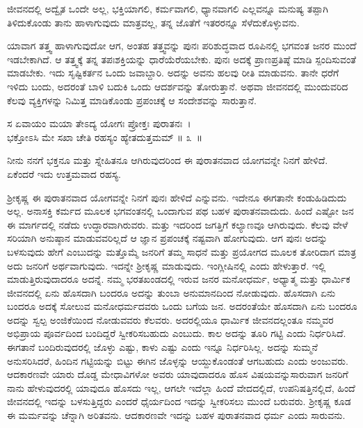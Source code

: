 ಜೀವನದಲ್ಲಿ ಅದ್ವೈತ ಒಂದೇ ಅಲ್ಲ, ಭಕ್ತಿಯಾಗಲಿ, ಕರ್ಮವಾಗಲಿ, ಧ್ಯಾನವಾಗಲಿ ಎಲ್ಲವನ್ನೂ ಮನುಷ್ಯ ತಪ್ಪಾಗಿ ತಿಳಿದುಕೊಂಡು ತಾನು ಹಾಳಾಗುವುದು ಮಾತ್ರವಲ್ಲ, ತನ್ನ ಜೊತೆಗೆ ಇತರರನ್ನೂ ಸೆಳೆದುಕೊಳ್ಳುವನು.

ಯಾವಾಗ ತತ್ತ್ವ ಹಾಳಾಗುವುದೋ ಆಗ, ಅಂತಹ ತತ್ತ್ವವನ್ನು ಪುನಃ ಪರಿಶುದ್ಧವಾದ ರೂಪಿನಲ್ಲಿ ಭಗವಂತ ಜನರ ಮುಂದೆ ಇಡಬೇಕಾಗಿದೆ. ಆ ತತ್ತ್ವಕ್ಕೆ ತನ್ನ ತಪಃಶಕ್ತಿಯನ್ನು ಧಾರೆಯೆರೆಯಬೇಕು. ಪುನಃ ಅದಕ್ಕೆ ಪ್ರಾಣಪ್ರತಿಷ್ಠೆ ಮಾಡಿ ಸ್ಪಂದಿಸುವಂತೆ ಮಾಡಬೇಕು. ಇದು ಸೃಷ್ಟಿಕರ್ತನ ಒಂದು ಜವಾಬ್ದಾರಿ. ಅದನ್ನು ಅವನು ಹಲವು ರೀತಿ ಮಾಡುವನು. ತಾನೇ ಧರೆಗೆ ಇಳಿದು ಬಂದು, ಅದರಂತೆ ಬಾಳಿ ಬದುಕಿ ಒಂದು ಆದರ್ಶವನ್ನು ತೋರುತ್ತಾನೆ. ಅಥವಾ ಜೀವನದಲ್ಲಿ ಮುಂದುವರಿದ ಕೆಲವು ವ್ಯಕ್ತಿಗಳನ್ನು ನಿಮಿತ್ತ ಮಾಡಿಕೊಂಡು ಪ್ರಪಂಚಕ್ಕೆ ಆ ಸಂದೇಶವನ್ನು ಸಾರುತ್ತಾನೆ.

\begin{shloka}
ಸ ಏವಾಯಂ ಮಯಾ ತೇಽದ್ಯ ಯೋಗಃ ಪ್ರೋಕ್ತಃ ಪುರಾತನಃ~।\\ಭಕ್ತೋಽಸಿ ಮೇ ಸಖಾ ಚೇತಿ ರಹಸ್ಯಂ ಹ್ಯೇತದುತ್ತಮಮ್ \hfill॥ ೩~॥
\end{shloka}

\begin{artha}
ನೀನು ನನಗೆ ಭಕ್ತನೂ ಮತ್ತು ಸ್ನೇಹಿತನೂ ಆಗಿರುವುದರಿಂದ ಈ ಪುರಾತನವಾದ ಯೋಗವನ್ನೇ ನಿನಗೆ ಹೇಳಿದೆ. ಏಕೆಂದರೆ ಇದು ಉತ್ತಮವಾದ ರಹಸ್ಯ.
\end{artha}

ಶ‍್ರೀಕೃಷ್ಣ ಈ ಪುರಾತನವಾದ ಯೋಗವನ್ನೇ ನಿನಗೆ ಪುನಃ ಹೇಳಿದೆ ಎನ್ನುವನು. ಇದೇನೂ ಈಗತಾನೇ ಕಂಡುಹಿಡಿದುದು ಅಲ್ಲ. ಅನಾಸಕ್ತಿ ಕರ್ಮದ ಮೂಲಕ ಭಗವಂತನಲ್ಲಿ ಒಂದಾಗುವ ಪಥ ಬಹಳ ಪುರಾತನವಾದುದು. ಹಿಂದೆ ಎಷ್ಟೋ ಜನ ಈ ಮಾರ್ಗದಲ್ಲಿ ನಡೆದು ಉದ್ಧಾರವಾಗಿರುವರು. ಮತ್ತು ಇದರಿಂದ ಜಗತ್ತಿಗೆ ಕಲ್ಯಾಣವೂ ಆಗಿರುವುದು. ಕೆಲವು ವೇಳೆ ಸರಿಯಾಗಿ ಅನುಷ್ಠಾನ ಮಾಡುವವರಿಲ್ಲದೆ ಆ ಜ್ಞಾನ ಪ್ರಪಂಚಕ್ಕೆ ನಷ್ಟವಾಗಿ ಹೋಗುವುದು. ಆಗ ಪುನಃ ಅದನ್ನು ಬಳಸುವುದು ಹೇಗೆ ಎಂಬುದನ್ನು ಮತ್ತೊಮ್ಮೆ ಜನರಿಗೆ ತಮ್ಮ ಸಾಧನೆ ಮತ್ತು ಪ್ರಯೋಗದ ಮೂಲಕ ತೋರಿದಾಗ ಮಾತ್ರ ಅದು ಜನರಿಗೆ ಅರ್ಥವಾಗುವುದು. ಇದನ್ನೇ ಶ‍್ರೀಕೃಷ್ಣ ಮಾಡುವುದು. ಇಂಗ್ಲೀಷಿನಲ್ಲಿ  ಎಂದು ಹೇಳುತ್ತಾರೆ. ಇಲ್ಲಿ ಮಾಡುತ್ತಿರುವುದಾದರೂ ಅದನ್ನೆ. ನಮ್ಮ ಭರತಖಂಡದಲ್ಲಿ ಇರುವ ಜನರ ಮನೋಧರ್ಮ, ಅಧ್ಯಾತ್ಮ ಮತ್ತು ಧಾರ್ಮಿಕ ಜೀವನದಲ್ಲಿ ಏನು ಹೊಸದಾಗಿ ಬಂದರೂ ಅದನ್ನು ತುಂಬಾ ಅನುಮಾನದಿಂದ ನೋಡುವುದು. ಹೊಸದಾಗಿ ಏನು ಬಂದರೂ ಅದಕ್ಕೆ ಸೋಲುವ ಮನೋಧರ್ಮದವರು ಒಂದು ಬಗೆಯ ಜನ. ಅದರಂತೆಯೇ ಹೊಸದಾಗಿ ಏನು ಬಂದರೂ ಅದನ್ನು ಸ್ವಲ್ಪ ಅಂಜಿಕೆಯಿಂದ ನೋಡುವವರು ಕೆಲವರು. ಅದರಲ್ಲಿಯೂ ಧಾರ್ಮಿಕ ಜೀವನದಲ್ಲಂತೂ ನಮ್ಮವರ ಅಭಿಪ್ರಾಯ ಪೂರ್ವದಿಂದ ಬಂದಿದ್ದರೆ ಸ್ವೀಕರಿಸಬಹುದು ಎಂಬುದು. ಕಾಲ ಅದನ್ನು ತೂರಿ ಗಟ್ಟಿ ಎಂದು ನಿರ್ಧರಿಸಿದೆ. ಈಗತಾನೆ ಬಂದಿರುವುದರಲ್ಲಿ ಜೊಳ್ಳು ಎಷ್ಟು, ಕಾಳು ಎಷ್ಟು ಎಂದು ಇನ್ನೂ ನಿರ್ಧರಿಸಿಲ್ಲ. ಅದನ್ನು ಸುಮ್ಮನೆ ಅನುಸರಿಸಿದರೆ, ಹಿಂದಿನ ಗಟ್ಟಿಯನ್ನು ಬಿಟ್ಟು ಈಗಿನ ಜೊಳ್ಳನ್ನು ಆಯ್ದುಕೊಂಡಂತೆ ಆಗಬಹುದು ಎಂದು ಅಂಜುವರು. ಆದಕಾರಣವೇ ಯಾರು ದೊಡ್ಡ ಮೇಧಾವಿಗಳೋ ಅವರು ಯಾವುದಾದರೂ ಹೊಸ ವಿಷಯವನ್ನು\break ಸಾರುವಾಗ ಜನರಿಗೆ ನಾನು ಹೇಳುವುದರಲ್ಲಿ ಯಾವುದೂ ಹೊಸದು ಇಲ್ಲ, ಆಗಲೇ ಇದೆಲ್ಲಾ ಹಿಂದೆ ವೇದದಲ್ಲಿದೆ, ಉಪನಿಷತ್ತಿನಲ್ಲಿದೆ, ಹಿಂದೆ ಜೀವನದಲ್ಲಿ ಇದನ್ನು ಬಳಸುತ್ತಿದ್ದರು ಎಂದರೆ ಧೈರ್ಯದಿಂದ ಇದನ್ನು ಸ್ವೀಕರಿಸಲು ಮುಂದೆ ಬರುವರು. ಶ‍್ರೀಕೃಷ್ಣ ಕೂಡ ಈ ಮರ್ಮವನ್ನು ಚೆನ್ನಾಗಿ ಅರಿತವನು. ಆದಕಾರಣವೇ ಇದನ್ನು ಬಹಳ ಪುರಾತನವಾದ ಧರ್ಮ ಎಂದು ಸಾರುವನು.

